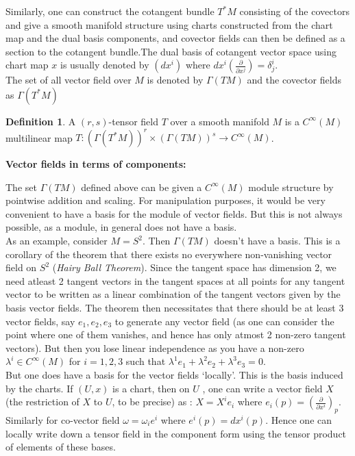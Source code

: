 \documentclass[a4paper]{report}
\theoremstyle{definition}
\newtheorem{definition}{Definition}[section]
\theoremstyle{remark}
\begin{document}
		Similarly, one can construct the cotangent bundle $T^*M$ consisting of the covectors and give a smooth manifold structure using charts constructed from the chart map and the dual basis components, and covector fields can then be defined as a section to the cotangent bundle.The dual basis of cotangent vector space using chart map $x$ is usually denoted by $(dx^i)$ where $dx^i(\tfrac{\partial}{\partial x^j}) = \delta_{j}^{i}$.\\
		The set of all vector field over $M$ is denoted by $\Gamma(TM)$ and the covector fields as $\Gamma(T^*M)$
		\begin{definition} 
			A $(r,s)$-tensor field $T$  over a smooth manifold $M$ is a $C^\infty(M)$ multilinear map 
			$ T: (\Gamma(T^*M))^r \times (\Gamma(TM))^s \to C^\infty(M) $.
		\end{definition}
		\begin{flushleft}
			\textbf{Vector fields in terms of components:}
		\end{flushleft}
		The set $\Gamma(TM)$ defined above can be given a $C^{\infty}(M)$ module structure by pointwise addition and scaling. For manipulation purposes, it would be very convenient to have a basis for the module of vector fields. But this is not always possible, as a module, in general does not have a basis. \\
		As an example, consider $M = S^2$. Then $\Gamma(TM)$ doesn’t have a basis. This is a corollary of the theorem that there exists no everywhere non-vanishing vector field on $S^2$ (\emph{Hairy Ball Theorem}). Since the tangent space has dimension 2, we need atleast 2 tangent vectors in the tangent spaces at all points for any tangent vector to be written as a linear combination of the tangent vectors given by the basis vector fields. The theorem then necessitates that there should be at least 3 vector fields, say $e_1,e_2,e_3$ to generate any vector field (as one can consider the point where one of them vanishes, and hence has only atmost 2 non-zero tangent vectors). But then you lose linear independence as you have a non-zero $\lambda^i \in C^{\infty}(M)$ for $i=1,2,3$ such that $\lambda^1e_1 + \lambda^2e_2 + \lambda^3e_3 = 0$. \\
		But one does have a basis for the vector fields ‘locally’. This is the basis induced by the charts. If $(U,x)$ is a chart, then on $U$ , one can write a vector field $X$ (the restriction of $X$ to $U$, to be precise) as :
		$ X=X^ie_i$ where $e_i(p) = \left(\tfrac{\partial}{\partial x^i}\right)_p$.
		Similarly for co-vector field $\omega = \omega_i e^i$ where $e^i(p) = dx^i(p)$. Hence one can locally write down a tensor field in the component form using the tensor product of elements of these bases.\\
\end{document}

